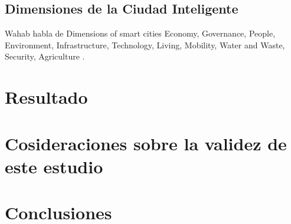 \documentclass[runningheads,a4paper,spanish]{llncs}
\begin{document}
\subsection{Dimensiones de la Ciudad Inteligente}\label{dimensiones}


Wahab habla de Dimensions of smart cities \cite{wahab_systematic_2020}
Economy,
Governance,
People,
Environment,
Infrastructure,
Technology,
Living,
Mobility,
Water and Waste,
Security, 
Agriculture
.



\section{Resultado}\label{resultados}

\section{Cosideraciones sobre la validez de este estudio}\label{validez}


\section{Conclusiones}\label{conclucion}


% 
% 
% 
\end{document}

